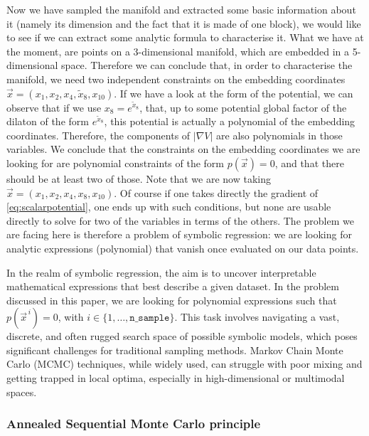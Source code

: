 \documentclass[11pt,a4paper]{article}
\begin{document}
		Now we have sampled the manifold and extracted some basic information about it (namely its dimension and the fact that it is made of one block), we would like to see if we can extract some analytic formula to characterise it. What we have at the moment, are points on a 3-dimensional manifold, which are embedded in a 5-dimensional space. Therefore we can conclude that, in order to characterise the manifold, we need two independent constraints on the embedding coordinates $\vec{x} = (x_1,x_2,x_4,\tilde{x}_8,x_{10})$. If we have a look at the form of the potential, we can observe that if we use $x_{8} = e^{\tilde{x}_8}$, that, up to some potential global factor of the dilaton of the form $e^{\tilde{x}_8}$, this potential is actually a polynomial of the embedding coordinates. Therefore, the components of $|\nabla V|$ are also polynomials in those variables. We conclude that the constraints on the embedding coordinates we are looking for are polynomial constraints of the form $p(\vec{x}) = 0$, and that there should be at least two of those. Note that we are now taking $\vec{x} = (x_1,x_2,x_4,x_8,x_{10})$. Of course if one takes directly the gradient of \eqref{eq:scalarpotential}, one ends up with such conditions, but none are usable directly to solve for two of the variables in terms of the others. The problem we are facing here is therefore a problem of symbolic regression: we are looking for analytic expressions (polynomial) that vanish once evaluated on our data points. 

		
		In the realm of symbolic regression, the aim is to uncover interpretable mathematical expressions that best describe a given dataset. In the problem discussed in this paper, we are looking for polynomial expressions such that $p(\vec{x}^{\,i}) = 0$, with $i \in \{1, \dots, \texttt{n\_{sample}}\}$. This task involves navigating a vast, discrete, and often rugged search space of possible symbolic models, which poses significant challenges for traditional sampling methods. Markov Chain Monte Carlo (MCMC) techniques, while widely used, can struggle with poor mixing and getting trapped in local optima, especially in high-dimensional or multimodal spaces.
		
		\subsubsection{Annealed Sequential Monte Carlo principle}
		
\end{document}
